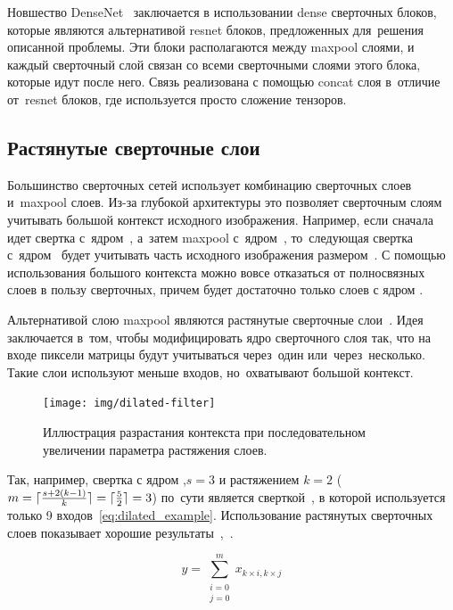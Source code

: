 Новшество DenseNet~\cite{densenet} заключается в использовании dense сверточных блоков, которые являются альтернативой resnet блоков\cite{resnet}, предложенных для~решения описанной проблемы. Эти блоки располагаются между maxpool слоями, и каждый сверточный слой связан со всеми сверточными слоями этого блока, которые идут после него. Связь реализована с помощью concat слоя в~отличие от~resnet блоков, где используется просто сложение тензоров.   

\subsection{Растянутые сверточные слои}

Большинство сверточных сетей использует комбинацию сверточных слоев и~maxpool слоев. Из-за глубокой архитектуры это позволяет сверточным слоям учитывать большой контекст исходного изображения. Например, если сначала идет свертка 
с~ядром~, а~затем maxpool с~ядром~, то~следующая свертка 
с~ядром~ будет учитывать часть исходного изображения 
размером~. С помощью использования большого контекста можно вовсе отказаться от полносвязных слоев в пользу сверточных, причем будет достаточно только слоев с ядром .

Альтернативой слою maxpool являются растянутые сверточные 
слои~\cite{dilated_conv}. Идея заключается в~том, чтобы модифицировать ядро 
сверточного слоя так, что на входе пиксели матрицы будут учитываться 
через~один или~через~несколько. Такие слои используют меньше входов, 
но~охватывают большой контекст. 

\newpage

\begin{figure}[hb]
  \texttt{[image: img/dilated-filter]}
  \caption{Иллюстрация разрастания контекста при последовательном увеличении параметра растяжения слоев.}
\end{figure}

\DeclarePairedDelimiter\ceil{\lceil}{\rceil}
\DeclarePairedDelimiter\floor{\lfloor}{\rfloor}

Так, например, свертка с ядром ,$s=3$ и растяжением $k=2$ 
\mbox{($m=\ceil{\frac{s+2(k-1)}{k}}=\ceil{\frac{5}{2}}=3$)} по~сути является 
сверткой~, в которой используется только 9 входов~\eqref{eq:dilated_example}. 
Использование растянутых сверточных слоев показывает хорошие результаты~\cite{segm_dcnn_crf},~\cite{deeplab}.

\begin{equation}
\label{eq:dilated_example}
y = \sum_{
  \substack{
    i=0 \\
    j=0
  }
}^{m}x_{k\times{}i,k\times{}j}
\end{equation}


